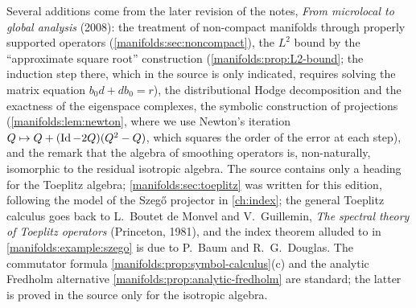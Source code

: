 Several additions come from the later revision of the notes, \emph{From
microlocal to global analysis} (2008): the treatment of non-compact manifolds through
properly supported operators (\cref{manifolds:sec:noncompact}), the $L^2$ bound by the
``approximate square root'' construction (\cref{manifolds:prop:L2-bound}; the
induction step there, which in the source is only indicated, requires solving the
matrix equation $b_0d+db_0=r$), the distributional Hodge decomposition and the
exactness of the eigenspace complexes, the symbolic construction of projections
(\cref{manifolds:lem:newton}, where we use Newton's iteration
$Q\mapsto Q+(\operatorname{Id}-2Q)(Q^2-Q)$, which squares the order of the error at each step), and
the remark that the algebra of smoothing operators is, non-naturally, isomorphic to
the residual isotropic algebra. The source contains only a heading for the Toeplitz
algebra; \cref{manifolds:sec:toeplitz} was written for this edition, following the
model of the Szeg\H{o} projector in \cref{ch:index}; the general Toeplitz calculus
goes back to L.~Boutet de Monvel and V.~Guillemin, \emph{The spectral theory of
Toeplitz operators} (Princeton, 1981), and the index theorem alluded to in
\cref{manifolds:example:szego} is due to P.~Baum and R.~G.~Douglas. The commutator formula
\cref{manifolds:prop:symbol-calculus}(c) and the analytic Fredholm alternative
\cref{manifolds:prop:analytic-fredholm} are standard; the latter is proved in the
source only for the isotropic algebra.
